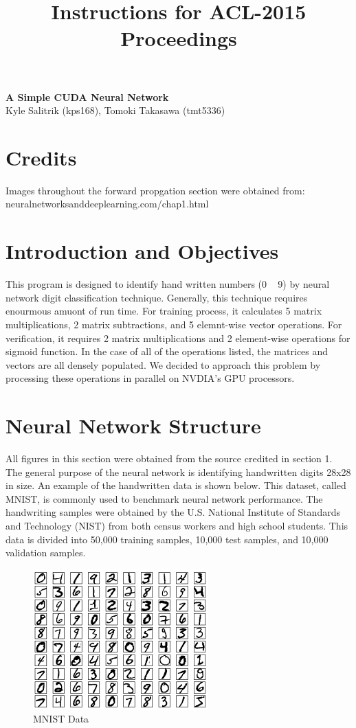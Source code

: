 \documentclass[11pt]{article}
\title{Instructions for ACL-2015 Proceedings}
\begin{document}
\begin{center}
	\textbf{\large{A Simple CUDA Neural Network}}\\
	Kyle Salitrik (kps168), Tomoki Takasawa (tmt5336)
\end{center}
\begin{abstract}
		
\end{abstract}

\section{Credits}
Images throughout the forward propgation section were obtained from: neuralnetworksanddeeplearning.com/chap1.html

\section{Introduction and Objectives}
This program is designed to identify hand written numbers (0 ~ 9) by neural network digit classification technique. Generally, this technique requires enourmous amuont of run time. For training process, it calculates 5 matrix multiplications, 2 matrix subtractions, and 5 elemnt-wise vector operations. For verification, it requires 2 matrix multiplications and 2 element-wise operations for sigmoid function. In the case of all of the operations listed, the matrices and vectors are all densely populated. We decided to approach this problem by processing these operations in parallel on NVDIA's GPU processors. 

\section{Neural Network Structure}
All figures in this section were obtained from the source credited in section 1. The general purpose of the neural network is identifying handwritten digits 28x28 in size. An example of the handwritten data is shown below. This dataset, called MNIST, is commonly used to benchmark neural network performance. The handwriting samples were obtained by the U.S. National Institute of Standards and Technology (NIST) from both census workers and high school students. This data is divided into 50,000 training samples, 10,000 test samples, and 10,000 validation samples.

\begin{figure}[H]
	\centering
	\includegraphics[width=.4\textwidth]{mnist_100_digits.png}
	\caption{MNIST Data}
\end{figure}
\end{document}
